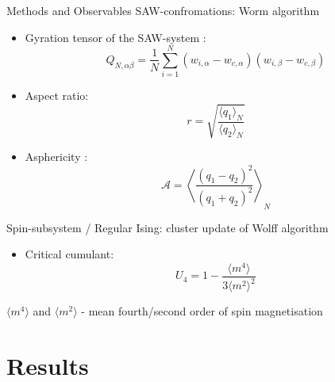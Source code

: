 \documentclass{beamer}
\begin{document}
\begin{frame}[allowframebreaks]{Methods and Observables}
	SAW-confromations: Worm algorithm
	\begin{itemize}
	\item Gyration tensor of the SAW-system \cite{Caracciolo2011}:
	\begin{equation}\label{eq:Ten_G1}
	    Q_{N,\alpha\beta} = \frac{1}{N} \sum^{N}_{i=1}(w_{i,\alpha} - w_{c, \alpha})(w_{i,\beta} - w_{c, \beta})
	\end{equation}
	\item  Aspect ratio\cite{Caracciolo2011}:
	\begin{equation}
	    r = \sqrt{\frac{\langle q_{1}\rangle_{N}}{\langle q_{2} \rangle_{N}}}
	\end{equation}
	\item  Asphericity \cite{Caracciolo2011}:
	\begin{equation}
	\label{eq:Asphericity}
	    \mathcal{A} = \left\langle \frac{(q_{1} - q_{2})^{2}}{(q_{1} + q_{2})^{2}} \right\rangle_{N}
	\end{equation}
	\end{itemize}
\framebreak

	Spin-subsystem / Regular Ising: cluster update of Wolff algorithm

	\begin{itemize}
		\item  Critical cumulant:
		\begin{equation}
		\label{eq:Cumulant}
		U_{4} = 1 - \frac{\langle m^{4} \rangle}{3 \langle m^{2} \rangle^{2}}
		\end{equation}
	\end{itemize}
	$\langle m^{4} \rangle$ and $\langle m^{2} \rangle$ - mean fourth/second order of spin magnetisation
\end{frame}

\section{Results}
\end{document}
